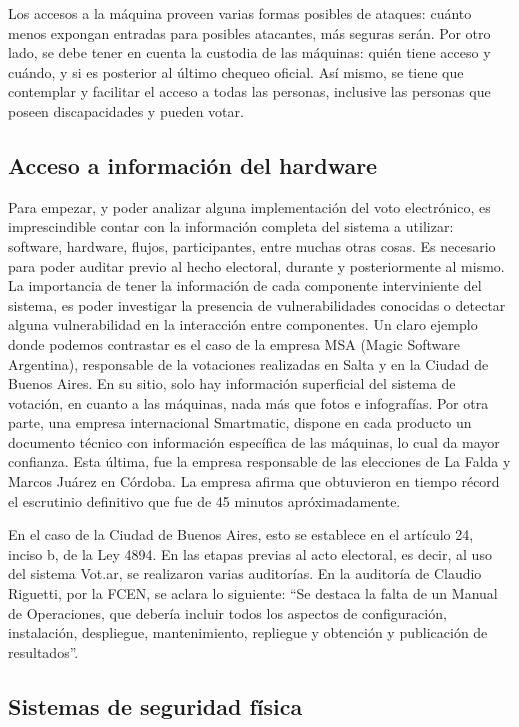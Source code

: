 Los accesos a la máquina proveen varias formas posibles de ataques: cuánto menos expongan entradas para posibles atacantes, más seguras serán. Por otro lado, se debe tener en cuenta la custodia de las máquinas: quién tiene acceso y cuándo, y si es posterior al último chequeo oficial. Así mismo, se tiene que contemplar y facilitar el acceso a todas las personas, inclusive las personas que poseen discapacidades y pueden votar.

\subsection{Acceso a información del hardware}

Para empezar, y poder analizar alguna implementación del voto electrónico, es imprescindible contar con la información completa del sistema a utilizar: software, hardware, flujos, participantes, entre muchas otras cosas. Es necesario para poder auditar previo al hecho electoral, durante y posteriormente al mismo. La importancia de tener la información de cada componente interviniente del sistema, es poder investigar la presencia de vulnerabilidades conocidas o detectar alguna vulnerabilidad en la interacción entre componentes. Un claro ejemplo donde podemos contrastar es el caso de la empresa MSA (Magic Software Argentina), responsable de la votaciones realizadas en Salta y en la Ciudad de Buenos Aires. En su sitio, solo hay información superficial del sistema de votación, en cuanto a las máquinas, nada más que fotos e infografías. Por otra parte, una empresa internacional Smartmatic, dispone en cada producto un documento técnico con información específica de las máquinas\cite{smartmatic}, lo cual da mayor confianza. Esta última, fue la empresa responsable de las elecciones de La Falda y Marcos Juárez en Córdoba. La empresa afirma que obtuvieron en tiempo récord el escrutinio definitivo que fue de 45 minutos apróximadamente\cite{smartmatic:cordoba}.

En el caso de la Ciudad de Buenos Aires, esto se establece en el artículo 24, inciso b, de la Ley 4894. En las etapas previas al acto electoral, es decir, al uso del sistema Vot.ar, se realizaron varias auditorías.
En la auditoría de Claudio Riguetti, por la FCEN, se aclara lo siguiente: “Se destaca la falta de un Manual de Operaciones, que debería incluir todos los aspectos de configuración, instalación, despliegue, mantenimiento, repliegue y obtención y publicación de resultados”.

\subsection{Sistemas de seguridad física}

